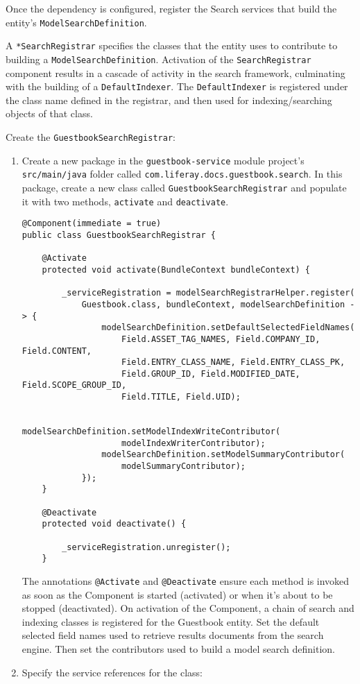 Once the dependency is configured, register the Search services that
build the entity's \texttt{ModelSearchDefinition}.

A \texttt{*SearchRegistrar} specifies the classes that the entity uses
to contribute to building a \texttt{ModelSearchDefinition}. Activation
of the \texttt{SearchRegistrar} component results in a cascade of
activity in the search framework, culminating with the building of a
\texttt{DefaultIndexer}. The \texttt{DefaultIndexer} is registered under
the class name defined in the registrar, and then used for
indexing/searching objects of that class.

Create the \texttt{GuestbookSearchRegistrar}:

\begin{enumerate}
\def\labelenumi{\arabic{enumi}.}
\item
  Create a new package in the \texttt{guestbook-service} module
  project's \texttt{src/main/java} folder called
  \texttt{com.liferay.docs.guestbook.search}. In this package, create a
  new class called \texttt{GuestbookSearchRegistrar} and populate it
  with two methods, \texttt{activate} and \texttt{deactivate}.

\begin{verbatim}
@Component(immediate = true)
public class GuestbookSearchRegistrar {

    @Activate
    protected void activate(BundleContext bundleContext) {

        _serviceRegistration = modelSearchRegistrarHelper.register(
            Guestbook.class, bundleContext, modelSearchDefinition -> {
                modelSearchDefinition.setDefaultSelectedFieldNames(
                    Field.ASSET_TAG_NAMES, Field.COMPANY_ID, Field.CONTENT,
                    Field.ENTRY_CLASS_NAME, Field.ENTRY_CLASS_PK,
                    Field.GROUP_ID, Field.MODIFIED_DATE, Field.SCOPE_GROUP_ID,
                    Field.TITLE, Field.UID);

                modelSearchDefinition.setModelIndexWriteContributor(
                    modelIndexWriterContributor);
                modelSearchDefinition.setModelSummaryContributor(
                    modelSummaryContributor);
            });
    }

    @Deactivate
    protected void deactivate() {

        _serviceRegistration.unregister();
    }
\end{verbatim}

  The annotations \texttt{@Activate} and \texttt{@Deactivate} ensure
  each method is invoked as soon as the Component is started (activated)
  or when it's about to be stopped (deactivated). On activation of the
  Component, a chain of search and indexing classes is registered for
  the Guestbook entity. Set the default selected field names used to
  retrieve results documents from the search engine. Then set the
  contributors used to build a model search definition.
\item
  Specify the service references for the class:


\end{enumerate}
